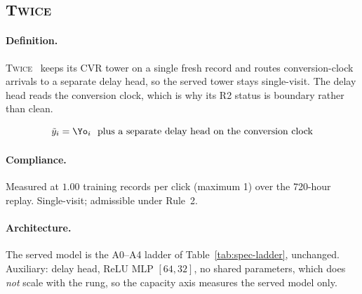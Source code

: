 \subsection{\textsc{Twice}}\label{app:m-TWICE}

\paragraph{Definition.} \textsc{Twice}~\cite{li2026twice} keeps its CVR tower on a single fresh record and
   routes conversion-clock arrivals to a separate delay head, so the served tower stays
   single-visit. The delay head reads the conversion clock, which is why its R2 status is
   boundary rather than clean.

\begin{equation}
\tilde y_i = \Yo_i \ \text{ plus a separate delay head on the conversion clock}
\end{equation}

\begin{center}\end{center}

\paragraph{Compliance.} Measured at $1.00$ training records per click (maximum 1) over the 720-hour replay. Single-visit; admissible under Rule~2.

\paragraph{Architecture.} The served model is the A0--A4 ladder of Table~\ref{tab:spec-ladder}, unchanged. Auxiliary: delay head, ReLU MLP $[64,32]$, no shared parameters, which does \emph{not} scale with the rung, so the capacity axis measures the served model only.

